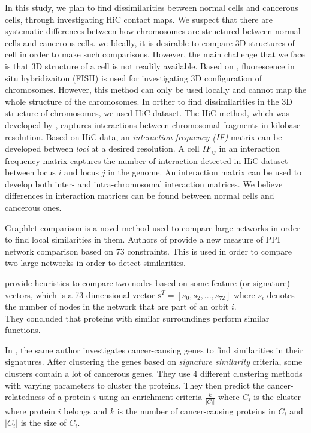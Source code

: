 \documentclass[a4,center,fleqn]{NAR}
\begin{document}
In this study, we plan to find dissimilarities between normal cells and cancerous cells,
through investigating HiC contact maps. 
We suspect that there are systematic differences between how chromosomes are structured
between normal cells and cancerous cells.
we 
Ideally, it is desirable to compare 3D structures of 
cell in order to make such comparisons.
However, the main challenge that we face is that 
3D structure of a cell is not readily available. Based on
\cite{adhikari2016chromosome3d}, fluorescence in situ hybridizaiton
(FISH) is used for investigating 3D configuration of chromosomes.
However, this method can only be used locally and cannot map
the whole structure of the chromosomes.
In orther to find dissimilarities in the 3D structure of 
chromosomes, we used HiC dataset.
The HiC method, which was developed by \cite{lieberman2009comprehensive}, captures interactions between 
chromosomal fragments in kilobase resolution. Based on HiC data, an
\textit{interaction frequency (IF) } matrix can be developed between \textit{loci} at a desired resolution.
A cell $IF_{ij}$ in an interaction frequency matrix captures the number of interaction detected
in HiC dataset between locus $i$ and locus $j$ in the genome.
An interaction matrix can be used to develop both inter- and intra-chromosomal interaction matrices.
We believe differences in interaction matrices can be found between normal cells and cancerous ones.

Graphlet comparison is a novel method used to compare large networks in order to
find local similarities in them.
Authors of \cite{prvzulj2007biological} provide a new measure of PPI
network comparison
based on 73 constraints. This is used in order to compare two large
networks in order to detect similarities.

\cite{milenkoviae2008uncovering} 
 provide heuristics to compare two nodes based on some feature
(or signature) vectors, which is a 73-dimensional vector
$\mathbf{s}^T
= [s_0, s_2, ..., s_{72}]$ where $s_i$ denotes the number of nodes in
the network that are part of an orbit $i$. \\
They concluded that proteins with similar surroundings perform
similar functions.

In \cite{milenkovic2010cancer}, the same author investigates 
cancer-causing genes to find similarities in their signatures. After
clustering the genes based on \textit{signature similarity} criteria,
some clusters contain a lot of cancerous genes.
They use 4 different clustering methods with varying parameters to cluster
the proteins. They then predict the cancer-relatedness of a protein 
$i$ using
an enrichment criteria $\frac{k}{|C_i|}$ where $C_i$ is the cluster
where protein $i$ belongs and $k$ is the number of cancer-causing
proteins in $C_i$ and $|C_i|$ is the size of $C_i$.
\end{document}
